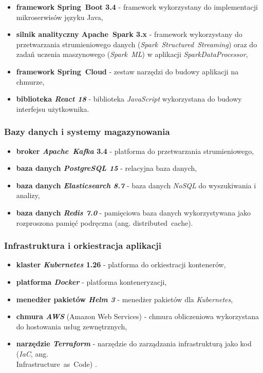 \begin{itemize}
    \item \textbf{framework \mbox{Spring Boot} 3.4} - framework wykorzystany do implementacji mikroserwisów języku Java,
    \item \textbf{silnik analityczny \mbox{Apache Spark} 3.x} \cite{spark_streaming} - framework wykorzystany do przetwarzania strumieniowego danych (\mbox{\textit{Spark Structured Streaming}}) \cite{chambers2018spark} oraz do zadań uczenia maszynowego (\mbox{\textit{Spark ML}}) w aplikacji \textit{SparkDataProcessor},
    \item \textbf{framework \mbox{Spring Cloud}} - zestaw narzędzi do budowy aplikacji na chmurze,
    \item \textbf{biblioteka \textit{React 18}} - biblioteka \textit{JavaScript} wykorzystana do budowy interfejsu użytkownika.
\end{itemize}

\subsubsection{Bazy danych i systemy magazynowania}
\label{subsubsec:bazy_danych}

\begin{itemize}
    \item \textbf{broker \mbox{\textit{Apache Kafka}} 3.4} \cite{kafka} - platforma do przetwarzania strumieniowego,
    \item \textbf{baza danych \textit{PostgreSQL 15}} - relacyjna baza danych,
    \item \textbf{baza danych \textit{Elasticsearch 8.7}} - baza danych \mbox{\textit{NoSQL}} \cite{nosql_definition} do wyszukiwania i analizy,
    \item \textbf{baza danych \textit{Redis 7.0}} - pamięciowa baza danych wykorzystywana jako rozproszona pamięć podręczna (ang. \mbox{distributed cache}).
\end{itemize}

\subsubsection{Infrastruktura i orkiestracja aplikacji}
\label{subsubsec:infrastruktura}

\begin{itemize}
    \item \textbf{klaster \textit{Kubernetes} 1.26} \cite{kubernetes} - platforma do orkiestracji kontenerów,
    \item \textbf{platforma \textit{Docker}} - platforma konteneryzacji,
    \item \textbf{menedżer pakietów \textit{Helm 3}} - menedżer pakietów dla \textit{Kubernetes},
    \item \textbf{chmura \textit{AWS}} (Amazon Web Services) \cite{aws_definition} - chmura obliczeniowa wykorzystana do hostowania usług zewnętrznych,
    \item \textbf{narzędzie \textit{Terraform}} - narzędzie do zarządzania infrastrukturą jako kod (\textit{IaC}, ang. \\ \mbox{Infrastructure as Code}) \cite{terraform_docs}.
\end{itemize}

